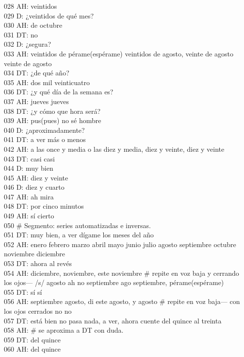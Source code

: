028 AH: veintidos \\
029 D: ¿veintidos de qué mes?\\
030 AH: de octubre\\
031 DT: no\\
032 D: ¿segura?\\
033 AH: veintidos de pérame(espérame) veintidos de agosto, veinte de agosto veinte de agosto\\
034 DT: ¿de qué año?\\
035 AH: dos mil veinticuatro\\
036 DT: ¿y qué día de la semana es?\\
037 AH: jueves jueves\\
038 DT: ¿y cómo que hora será?\\
039 AH: pus(pues) no sé hombre\\
040 D: ¿aproximadamente?\\
041 DT: a ver más o menos\\
042 AH: a las once y media o las diez y media, diez y veinte, diez y veinte\\
043 DT: casi casi\\
044 D: muy bien\\
045 AH: diez y veinte\\
046 D: diez y cuarto\\
047 AH: ah mira\\
048 DT: por cinco minutos\\
049 AH: sí cierto\\
050 \# Segmento: series automatizadas e inversas.\\
051 DT: muy bien, a ver dígame los meses del año\\
052 AH: enero febrero marzo abril mayo junio julio agosto septiembre octubre noviembre diciembre\\
053 DT: ahora al revés\\
054 AH: diciembre, noviembre, este noviembre \# repite en voz baja y cerrando los ojos--- /s/ agosto ah no septiembre ago septiembre, pérame(espérame)\\
055 DT: sí sí\\
056 AH: septiembre agosto, di este agosto, y agosto \# repite en voz baja--- con los ojos cerrados no no\\
057 DT: está bien no pasa nada, a ver, ahora cuente del quince al treinta\\
058 AH: \# se aproxima a DT con duda.\\
059 DT: del quince\\
060 AH: del quince\\

